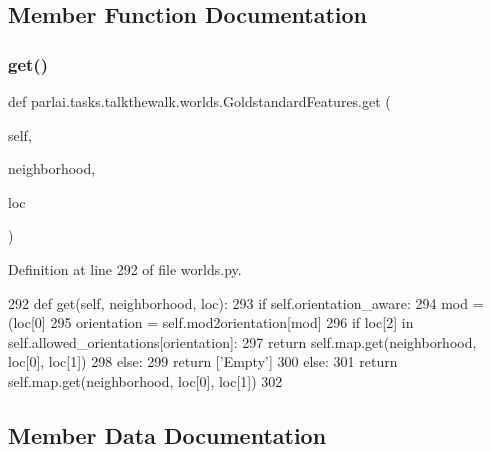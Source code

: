 \subsection{Member Function Documentation}
\mbox{\label{classparlai_1_1tasks_1_1talkthewalk_1_1worlds_1_1GoldstandardFeatures_af19258420105e5d0445029d8505e7daf}} 
\subsubsection{\texorpdfstring{get()}{get()}}
{\footnotesize\ttfamily def parlai.\+tasks.\+talkthewalk.\+worlds.\+Goldstandard\+Features.\+get (\begin{DoxyParamCaption}\item[{}]{self,  }\item[{}]{neighborhood,  }\item[{}]{loc }\end{DoxyParamCaption})}



Definition at line 292 of file worlds.\+py.


\begin{DoxyCode}
292     \textcolor{keyword}{def }get(self, neighborhood, loc):
293         \textcolor{keywordflow}{if} self.orientation\_aware:
294             mod = (loc[0] %
295             orientation = self.mod2orientation[mod]
296             \textcolor{keywordflow}{if} loc[2] \textcolor{keywordflow}{in} self.allowed\_orientations[orientation]:
297                 \textcolor{keywordflow}{return} self.map.get(neighborhood, loc[0], loc[1])
298             \textcolor{keywordflow}{else}:
299                 \textcolor{keywordflow}{return} [\textcolor{stringliteral}{'Empty'}]
300         \textcolor{keywordflow}{else}:
301             \textcolor{keywordflow}{return} self.map.get(neighborhood, loc[0], loc[1])
302 \end{DoxyCode}


\subsection{Member Data Documentation}
\mbox{\label{classparlai_1_1tasks_1_1talkthewalk_1_1worlds_1_1GoldstandardFeatures_ab3bb9dde5bd73f87d51b926d2cbac56d}} 
